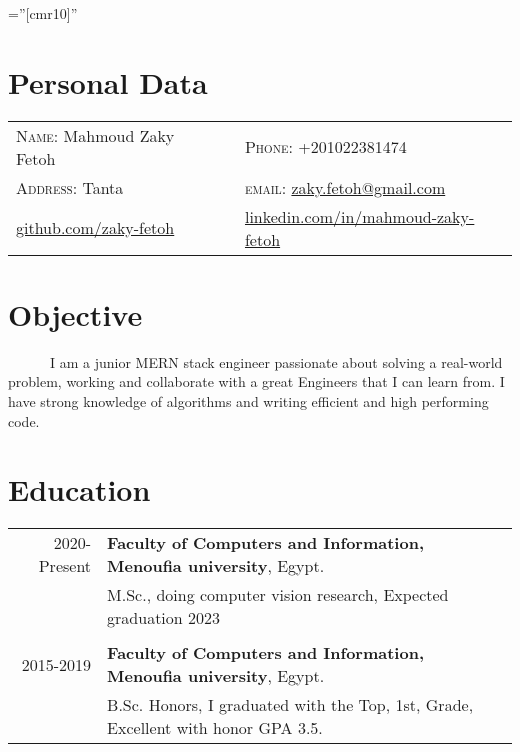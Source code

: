 \documentclass[a4paper,10pt]{article} %
\begin{document}
\pagestyle{empty} %
\font\fb=''[cmr10]'' %

\par{\bigskip\par} %

\section{\textbf{Personal Data}}

\begin{tabular}{lp{4cm}l}
\textsc{Name:} 	Mahmoud Zaky Fetoh && \textsc{Phone:} +201022381474 \\

\textsc{Address:} Tanta && \textsc{email:}   \href{mailto:zaky.fetoh@gmail.com}{zaky.fetoh@gmail.com}  \\

\href{https://github.com/zaky-fetoh}{github.com/zaky-fetoh} && \href{https://www.linkedin.com/in/mahmoud-zaky-fetoh/}{linkedin.com/in/mahmoud-zaky-fetoh}  \\

\end{tabular}



\section{\textbf{Objective}}
~~~~~~I am a junior MERN stack engineer passionate about solving a real-world problem, working and collaborate with a great Engineers that I can learn from. I have strong knowledge of algorithms and writing efficient and high performing code. 

\section{\textbf{Education}}
\begin{tabular}{r|l}
    2020-Present  & \textbf{Faculty of Computers and Information, Menoufia university}, Egypt.\\ & M.Sc., doing computer vision research, Expected graduation  2023 \\
    &\\
    2015-2019 & \textbf{Faculty of Computers and Information, Menoufia university}, Egypt. \\ & B.Sc. Honors, I graduated with the Top, 1st, Grade, Excellent with honor GPA 3.5. \\
    \end{tabular}
\end{document}
